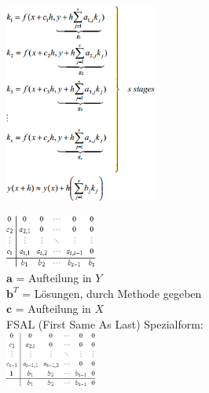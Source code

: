     
      \begin{minipage}{6cm}
        \includegraphics[width=5cm]{./bilder/ode_rungekutta_framework1.png}
      \end{minipage}
      \begin{minipage}{4.5cm}
        \includegraphics[width=3cm]{./bilder/ode_rungekutta_butcher.png}\\
        $\bm a$ = Aufteilung in $Y$\\
        $\bm b^T$ = Lösungen, durch Methode gegeben\\
        $\bm c$ = Aufteilung in $X$\\
        
        FSAL (First Same As Last) Spezialform:\\
        \includegraphics[width=3cm]{./bilder/butcher_fsal.png} 
      \end{minipage}
      \hspace{0.5cm}
